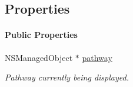 \subsection*{Properties}
\begin{Indent}\paragraph*{Public Properties}
\begin{DoxyCompactItemize}
\item 
\hypertarget{interface_p_c_graph_view_controller_aad1a13780ea4ee75c445b05a5cdf887a}{
NSManagedObject $\ast$ \hyperlink{interface_p_c_graph_view_controller_aad1a13780ea4ee75c445b05a5cdf887a}{pathway}}
\label{interface_p_c_graph_view_controller_aad1a13780ea4ee75c445b05a5cdf887a}

\begin{DoxyCompactList}\small\item\em Pathway currently being displayed. \end{DoxyCompactList}\end{DoxyCompactItemize}
\end{Indent}
